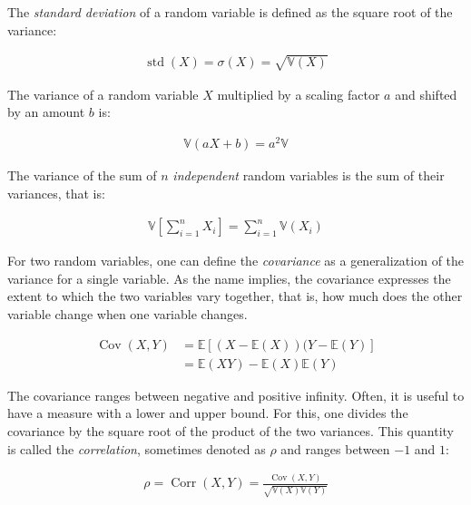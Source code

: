 The \emph{standard deviation} of a random variable is defined as the square root of the variance:

\begin{align*}
\operatorname*{std}(X) = \sigma(X) = \sqrt{\mathbb{V}(X)}
\end{align*}

The variance of a random variable $X$ multiplied by a scaling factor $a$ and shifted by an amount $b$ is:

\begin{align*}
\mathbb{V}(aX + b) = a^2 \mathbb{V}
\end{align*}

The variance of the sum of $n$ \emph{independent} random variables is the sum of their variances, that is:

\begin{align*}
\mathbb{V} \left[ \sum_{i=1}^n X_i \right] = \sum_{i=1}^n \mathbb{V}(X_i)
\end{align*}

For two random variables, one can define the \emph{covariance} as a generalization of the variance for a single variable. As the name implies, the covariance expresses the extent to which the two variables vary together, that is, how much does the other variable change when one variable changes. 

\begin{align*}
\operatorname*{Cov}(X, Y) &= \mathbb{E} \left[ (X - \mathbb{E}(X)) (Y - \mathbb{E}(Y) \right] \\
&= \mathbb{E}(XY) - \mathbb{E}(X)\mathbb{E}(Y)
\end{align*}

The covariance ranges between negative and positive infinity. Often, it is useful to have a measure with a lower and upper bound. For this, one divides the covariance by the square root of the product of the two variances. This quantity is called the \emph{correlation}, sometimes denoted as $\rho$ and ranges between $-1$ and $1$:

\begin{align*}
\rho = \operatorname*{Corr}(X, Y) = \frac{\operatorname*{Cov}(X, Y)}{\sqrt{\mathbb{V}(X) \mathbb{V}(Y)}}
\end{align*}


